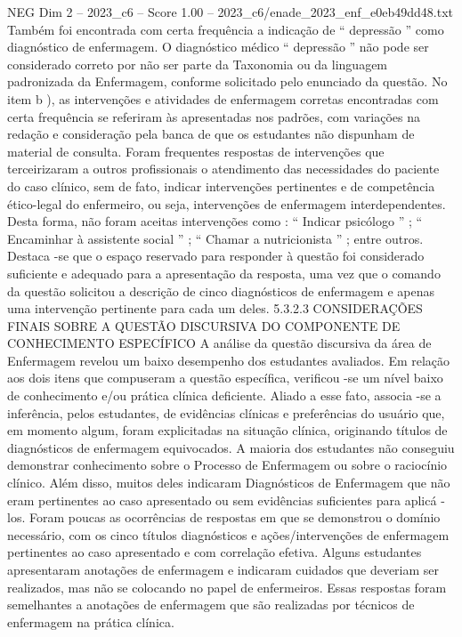 \begin{textsample}{NEG Dim 2 – 2023\_c6 – Score 1.00 – 2023\_c6/enade\_2023\_enf\_e0eb49dd48.txt}
Também foi encontrada com certa frequência a indicação de “ depressão ” como diagnóstico de enfermagem.
O diagnóstico médico “ depressão ” não pode ser considerado correto por não ser parte da Taxonomia ou da linguagem padronizada da Enfermagem, conforme solicitado pelo enunciado da questão.
No item b ), as intervenções e atividades de enfermagem corretas encontradas com certa frequência se referiram às apresentadas nos padrões, com variações na redação e consideração pela banca de que os estudantes não dispunham de material de consulta.
Foram frequentes respostas de intervenções que terceirizaram a outros profissionais o atendimento das necessidades do paciente do caso clínico, sem de fato, indicar intervenções pertinentes e de competência ético-legal do enfermeiro, ou seja, intervenções de enfermagem interdependentes.
Desta forma, não foram aceitas intervenções como : “ Indicar psicólogo ” ; “ Encaminhar à assistente social ” ; “ Chamar a nutricionista ” ; entre outros.
Destaca -se que o espaço reservado para responder à questão foi considerado suficiente e adequado para a apresentação da resposta, uma vez que o comando da questão solicitou a descrição de cinco diagnósticos de enfermagem e apenas uma intervenção pertinente para cada um deles. 5.3.2.3 CONSIDERAÇÕES FINAIS SOBRE A QUESTÃO DISCURSIVA DO COMPONENTE DE CONHECIMENTO ESPECÍFICO A análise da questão discursiva da área de Enfermagem revelou um baixo desempenho dos estudantes avaliados.
Em relação aos dois itens que compuseram a questão específica, verificou -se um nível baixo de conhecimento e/ou prática clínica deficiente.
Aliado a esse fato, associa -se a inferência, pelos estudantes, de evidências clínicas e preferências do usuário que, em momento algum, foram explicitadas na situação clínica, originando títulos de diagnósticos de enfermagem equivocados.
A maioria dos estudantes não conseguiu demonstrar conhecimento sobre o Processo de Enfermagem ou sobre o raciocínio clínico.
Além disso, muitos deles indicaram Diagnósticos de Enfermagem que não eram pertinentes ao caso apresentado ou sem evidências suficientes para aplicá -los.
Foram poucas as ocorrências de respostas em que se demonstrou o domínio necessário, com os cinco títulos diagnósticos e ações/intervenções de enfermagem pertinentes ao caso apresentado e com correlação efetiva.
Alguns estudantes apresentaram anotações de enfermagem e indicaram cuidados que deveriam ser realizados, mas não se colocando no papel de enfermeiros.
Essas respostas foram semelhantes a anotações de enfermagem que são realizadas por técnicos de enfermagem na prática clínica.

\end{textsample}
